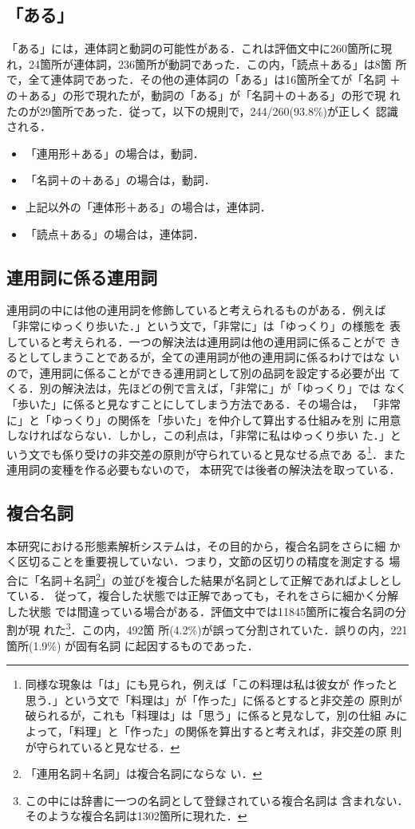 \subsection{「ある」}
「ある」には，連体詞と動詞の可能性がある．これは評価文中に260箇所に現
れ，24箇所が連体詞，236箇所が動詞であった．この内，「読点＋ある」は8箇
所で，全て連体詞であった．その他の連体詞の「ある」は16箇所全てが「名詞
＋の＋ある」の形で現れたが，動詞の「ある」が「名詞＋の＋ある」の形で現
れたのが29箇所であった．従って，以下の規則で，244/260(93.8\%)が正しく
認識される．
\begin{itemize}
\item 「連用形＋ある」の場合は，動詞．
\item 「名詞＋の＋ある」の場合は，動詞．
\item 上記以外の「連体形＋ある」の場合は，連体詞．
\item 「読点＋ある」の場合は，連体詞．
\end{itemize}

\subsection{連用詞に係る連用詞}
連用詞の中には他の連用詞を修飾していると考えられるものがある．例えば
「非常にゆっくり歩いた．」という文で，「非常に」は「ゆっくり」の様態を
表していると考えられる．一つの解決法は連用詞は他の連用詞に係ることがで
きるとしてしまうことであるが，全ての連用詞が他の連用詞に係るわけではな
いので，連用詞に係ることができる連用詞として別の品詞を設定する必要が出
てくる．別の解決法は，先ほどの例で言えば，「非常に」が「ゆっくり」では
なく「歩いた」に係ると見なすことにしてしまう方法である．その場合は，
「非常に」と「ゆっくり」の関係を「歩いた」を仲介して算出する仕組みを別
に用意しなければならない．しかし，この利点は，「非常に私はゆっくり歩い
た．」という文でも係り受けの非交差の原則が守られていると見なせる点であ
る\footnote{同様な現象は「は」にも見られ，例えば「この料理は私は彼女が
作ったと思う．」という文で「料理は」が「作った」に係るとすると非交差の
原則が破られるが，これも「料理は」は「思う」に係ると見なして，別の仕組
みによって，「料理」と「作った」の関係を算出すると考えれば，非交差の原
則が守られていると見なせる．}．また連用詞の変種を作る必要もないので，
本研究では後者の解決法を取っている．

\subsection{複合名詞}
本研究における形態素解析システムは，その目的から，複合名詞をさらに細
かく区切ることを重要視していない．つまり，文節の区切りの精度を測定する
場合に「名詞＋名詞\footnote{「連用名詞＋名詞」は複合名詞にならな
い．}」の並びを複合した結果が名詞として正解であればよしとしている．
従って，複合した状態では正解であっても，それをさらに細かく分解した状態
では間違っている場合がある．評価文中では11845箇所に複合名詞の分割が現
れた\footnote{この中には辞書に一つの名詞として登録されている複合名詞は
含まれない．そのような複合名詞は1302箇所に現れた．}．この内，492箇
所(4.2\%)が誤って分割されていた．誤りの内，221箇所(1.9\%) が固有名詞
に起因するものであった．

